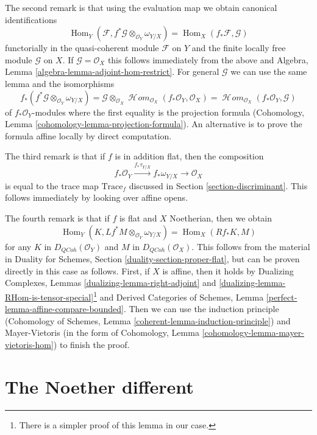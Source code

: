 \documentclass{stacks-project}
\theoremstyle{plain}
\theoremstyle{definition}
\theoremstyle{remark}
\numberwithin{equation}{subsection}
\def\Hom{\mathop{\mathrm{Hom}}\nolimits}
\def\SheafHom{\mathop{\mathcal{H}\!\mathit{om}}\nolimits}
\def\QCoh{\mathit{QCoh}}
\begin{document}
\medskip\noindent
The second remark is that using the evaluation map we obtain
canonical identifications
$$
\Hom_Y(\mathcal{F}, f^*\mathcal{G} \otimes_{\mathcal{O}_Y} \omega_{Y/X})
=
\Hom_X(f_*\mathcal{F}, \mathcal{G})
$$
functorially in the quasi-coherent module $\mathcal{F}$ on $Y$
and the finite locally free module $\mathcal{G}$ on $X$.
If $\mathcal{G} = \mathcal{O}_X$ this follows immediately
from the above and
Algebra, Lemma \ref{algebra-lemma-adjoint-hom-restrict}.
For general $\mathcal{G}$ we can use the same lemma and the
isomorphisms
$$
f_*(f^*\mathcal{G} \otimes_{\mathcal{O}_Y} \omega_{Y/X}) =
\mathcal{G} \otimes_{\mathcal{O}_X}
\SheafHom_{\mathcal{O}_X}(f_*\mathcal{O}_Y, \mathcal{O}_X) =
\SheafHom_{\mathcal{O}_X}(f_*\mathcal{O}_Y, \mathcal{G})
$$
of $f_*\mathcal{O}_Y$-modules where the first equality is the
projection formula
(Cohomology, Lemma \ref{cohomology-lemma-projection-formula}).
An alternative is to prove the formula affine locally by
direct computation.

\medskip\noindent
The third remark is that if $f$ is in addition flat, then the
composition
$$
f_*\mathcal{O}_Y \xrightarrow{f_*\tau_{Y/X}} f_*\omega_{Y/X}
\longrightarrow \mathcal{O}_X
$$
is equal to the trace map $\text{Trace}_f$ discussed in
Section \ref{section-discriminant}. This follows immediately by
looking over affine opens.

\medskip\noindent
The fourth remark is that if $f$ is flat and $X$ Noetherian, then
we obtain
$$
\Hom_Y(K, Lf^*M \otimes_{\mathcal{O}_Y} \omega_{Y/X})
=
\Hom_X(Rf_*K, M)
$$
for any $K$ in $D_\QCoh(\mathcal{O}_Y)$ and $M$ in $D_\QCoh(\mathcal{O}_X)$.
This follows from the material in
Duality for Schemes, Section \ref{duality-section-proper-flat},
but can be proven directly in this case as follows.
First, if $X$ is affine, then it holds by
Dualizing Complexes, Lemmas \ref{dualizing-lemma-right-adjoint} and
\ref{dualizing-lemma-RHom-is-tensor-special}\footnote{There is a
simpler proof of this lemma in our case.} and
Derived Categories of Schemes, Lemma \ref{perfect-lemma-affine-compare-bounded}.
Then we can use the induction principle
(Cohomology of Schemes, Lemma \ref{coherent-lemma-induction-principle})
and Mayer-Vietoris
(in the form of Cohomology, Lemma \ref{cohomology-lemma-mayer-vietoris-hom})
to finish the proof.







\section{The Noether different}
\label{section-noether-different}
\end{document}
